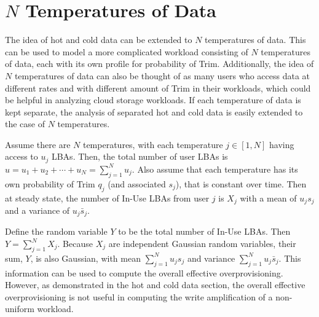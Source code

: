 \documentclass[prodmode,acmtos]{acmsmall}
\begin{document}
\section{$N$ Temperatures of Data}
The idea of hot and cold data can be extended to $N$ temperatures of data.  This can be used to model a more complicated workload consisting of $N$ temperatures of data, each with its own profile for probability of Trim.  Additionally, the idea of $N$ temperatures of data can also be thought of as many users who access data at different rates and with different amount of Trim in their workloads, which could be helpful in analyzing cloud storage workloads.  If each temperature of data is kept separate, the analysis of separated hot and cold data is easily extended to the case of $N$ temperatures.

Assume there are $N$ temperatures, with each temperature $j\in[1,N]$ having access to $u_j$ LBAs.  Then, the total number of user LBAs is $u=u_1+u_2+\cdots+u_N=\sum_{j=1}^{N} u_j$.  Also assume that each temperature has its own probability of Trim $q_j$ (and associated $s_j$), that is constant over time.  Then at steady state, the number of In-Use LBAs from user $j$ is $X_j$ with a mean of $u_j s_j$ and a variance of $u_j \bar{s}_j$.

Define the random variable $Y$ to be the total number of In-Use LBAs.  Then $Y = \sum_{j=1}^N X_j$.  Because $X_j$ are independent Gaussian random variables, their sum, $Y$, is also Gaussian, with mean $\sum_{j=1}^N u_j s_j$ and variance $\sum_{j=1}^N u_j \bar{s}_j$.  This information can be used to compute the overall effective overprovisioning.  However, as demonstrated in the hot and cold data section, the overall effective overprovisioning is not useful in computing the write amplification of a non-uniform workload.
\end{document}
